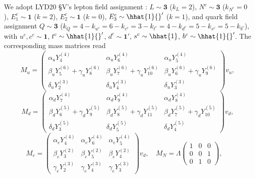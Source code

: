 We adopt LYD20 \S V's lepton field assignment \cite[Eq.~(\ref{eq:Wlep})
of][]{LYD20}: $L\sim\mathbf{3}$ ($k_L=2$), $N^{c}\sim\mathbf{3}$
($k_{N^c}=0$), $E_{1}^{c}\sim\mathbf{1}$ ($k=2$), $E_{2}^{c}\sim
\mathbf{1}$ ($k=0$), $E_{3}^{c}\sim\hhat{1}{}'$ ($k=1$), and quark
field assignment $Q\sim\mathbf{3}$ ($k_{Q}=4-k_{u^{c}}=
6-k_{c^{c}}=3-k_{t^{c}}=4-k_{d^{c}}=5-k_{s^{c}}=5-k_{b^{c}}$), with
$u^{c},c^{c}\sim\mathbf{1}$, $t^{c}\sim\hhat{1}{}'$,
$d^{c}\sim\mathbf{1}'$, $s^{c}\sim\hhat{1}$, $b^{c}\sim\hhat{1}{}'$.
The corresponding mass matrices read
\begin{equation}
\label{eq:v75_Mu}
M_{u}=\begin{pmatrix}
 \alpha_{u} Y_{4}^{(4)} & \alpha_{u} Y_{6}^{(4)} & \alpha_{u} Y_{5}^{(4)} \\
 \beta_{u} Y_{5}^{(6)}+\gamma_{u} Y_{8}^{(6)} &
   \beta_{u} Y_{7}^{(6)}+\gamma_{u} Y_{10}^{(6)} &
   \beta_{u} Y_{6}^{(6)}+\gamma_{u} Y_{9}^{(6)} \\
 \delta_{u} Y_{2}^{(3)} & \delta_{u} Y_{4}^{(3)} & \delta_{u} Y_{3}^{(3)}
\end{pmatrix}v_{u},
\end{equation}
\begin{equation}
\label{eq:v75_Md}
M_{d}=\begin{pmatrix}
\alpha_{d} Y_{7}^{(4)} & \alpha_{d} Y_{9}^{(4)} & \alpha_{d} Y_{8}^{(4)} \\
\beta_{d} Y_{6}^{(5)}+\gamma_{d} Y_{9}^{(5)} &
  \beta_{d} Y_{8}^{(5)}+\gamma_{d} Y_{11}^{(5)} &
  \beta_{d} Y_{7}^{(5)}+\gamma_{d} Y_{10}^{(5)} \\
\delta_{d} Y_{3}^{(5)} & \delta_{d} Y_{5}^{(5)} & \delta_{d} Y_{4}^{(5)}
\end{pmatrix}v_{d},
\end{equation}
\begin{equation}
\label{eq:v75_Mlep}
M_{e}=\begin{pmatrix}
\alpha_{e} Y_{4}^{(4)} & \alpha_{e} Y_{6}^{(4)} & \alpha_{e} Y_{5}^{(4)}\\
\beta_{e} Y_{3}^{(2)} & \beta_{e} Y_{5}^{(2)} & \beta_{e} Y_{4}^{(2)} \\
\gamma_{e} Y_{2}^{(3)} & \gamma_{e} Y_{4}^{(3)} & \gamma_{e} Y_{3}^{(3)}
\end{pmatrix}v_{d},\quad
M_{N}=\Lambda\!\begin{pmatrix} 1&0&0\\0&0&1\\0&1&0 \end{pmatrix},\quad
\end{equation}
